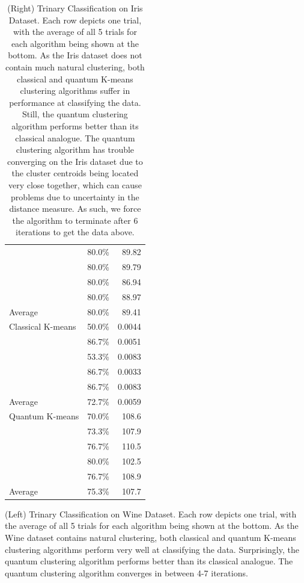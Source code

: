 \documentclass[twocolumn, english]{revtex4-2}
\begin{document}
\begin{table}
\begin{tabular}{|l|r|r}
\cline{2-3}
&80.0\%&89.82\\
\cline{2-3}
&80.0\%&89.79\\
\cline{2-3}
&80.0\%&86.94\\
\cline{2-3}
&80.0\%&88.97\\
\hline\hline
Average&80.0\%&89.41\\
\hline\hline
Classical K-means&50.0\%&0.0044\\
\cline{2-3}
&86.7\%&0.0051\\
\cline{2-3}
&53.3\%&0.0083\\
\cline{2-3}
&86.7\%&0.0033\\
\cline{2-3}
&86.7\%&0.0083\\
\hline\hline
Average&72.7\%&0.0059\\
\hline\hline
Quantum K-means&70.0\%&108.6\\
\cline{2-3}
&73.3\%&107.9\\
\cline{2-3}
&76.7\%&110.5\\
\cline{2-3}
&80.0\%&102.5\\
\cline{2-3}
&76.7\%&108.9\\
\hline\hline
Average&75.3\%&107.7\\
\hline\hline
\end{tabular}
\caption{(Left) Trinary Classification on Wine Dataset. Each row depicts one trial, with the average of all 5 trials for each algorithm being shown at the bottom. As the Wine dataset contains natural clustering, both classical and quantum K-means clustering algorithms perform very well at classifying the data. Surprisingly, the quantum clustering algorithm performs better than its classical analogue. The quantum clustering algorithm converges in between 4-7 iterations. }
\caption{(Right) Trinary Classification on Iris Dataset. Each row depicts one trial, with the average of all 5 trials for each algorithm being shown at the bottom. As the Iris dataset does not contain much natural clustering, both classical and quantum K-means clustering algorithms suffer in performance at classifying the data. Still, the quantum clustering algorithm performs better than its classical analogue. The quantum clustering algorithm has trouble converging on the Iris dataset due to the cluster centroids being located very close together, which can cause problems due to uncertainty in the distance measure. As such, we force the algorithm to terminate after 6 iterations to get the data above.}
\end{table}
\end{document}
